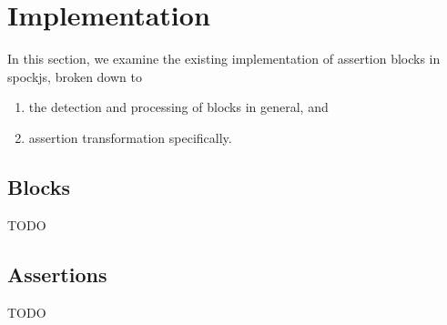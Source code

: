 \section{Implementation}
In this section, we examine the existing implementation of assertion blocks in spockjs, broken down to
\begin{enumerate}
  \item the detection and processing of blocks in general, and
  \item assertion transformation specifically.
\end{enumerate}

\subsection{Blocks}
TODO

\subsection{Assertions}
TODO
